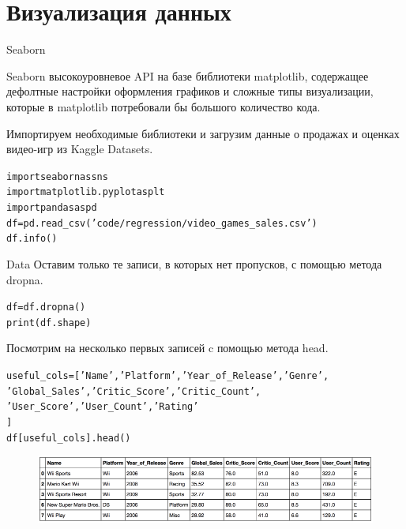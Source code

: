 \documentclass{beamer}
\begin{document}
\section{Визуализация данных}

\begin{frame}[fragile]{Seaborn}
\begin{block}{Seaborn}
высокоуровневое API на базе библиотеки matplotlib, содержащее дефолтные настройки оформления графиков и сложные типы визуализации, которые в matplotlib потребовали бы большого количество кода.
\end{block}
Импортируем необходимые библиотеки и загрузим данные о продажах и оценках видео-игр из Kaggle Datasets.
\begin{alltt}
import seaborn as sns
import matplotlib.pyplot as plt
import pandas as pd
df = pd.read_csv('code/regression/video_games_sales.csv')
df.info()
\end{alltt}
\end{frame}

\begin{frame}[fragile]{Data}
Оставим только те записи, в которых нет пропусков, с помощью метода dropna.
\begin{alltt}
df = df.dropna()
print(df.shape)
\end{alltt}
Посмотрим на несколько первых записей c помощью метода head. 
\begin{alltt}
useful_cols = ['Name', 'Platform', 'Year_of_Release', 'Genre', 
               'Global_Sales', 'Critic_Score', 'Critic_Count',
               'User_Score', 'User_Count', 'Rating'
              ]
df[useful_cols].head()
\end{alltt}
\begin{figure}[h]
\centering
\includegraphics[scale=0.3]{images/seaborn-01.png}
\end{figure}
\end{frame}
\end{document}
